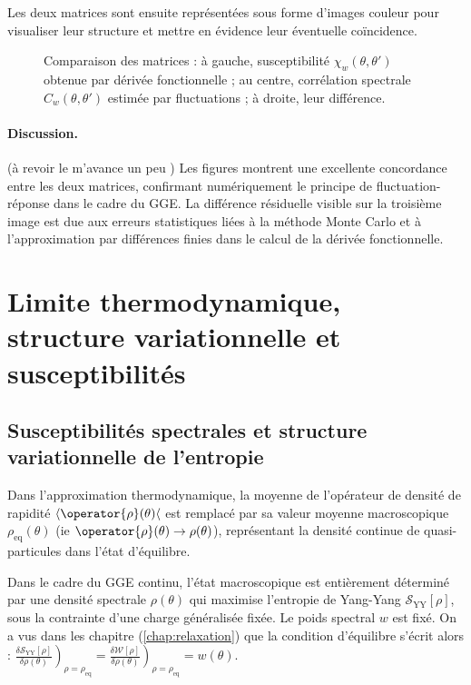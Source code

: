 Les deux matrices sont ensuite représentées sous forme d'images couleur pour visualiser leur structure et mettre en évidence leur éventuelle coïncidence.

\begin{figure}[H]
    \centering
    \caption{Comparaison des matrices : à gauche, susceptibilité \( \chi_w(\theta,\theta') \) obtenue par dérivée fonctionnelle ; au centre, corrélation spectrale \( C_w(\theta,\theta') \) estimée par fluctuations ; à droite, leur différence.}
    \label{fig:comparison_chi_C}
\end{figure}

\paragraph{Discussion.}

{\color{blue} { (\color{red}à revoir le m'avance un peu )} Les figures montrent une excellente concordance entre les deux matrices, confirmant numériquement le principe de fluctuation-réponse dans le cadre du GGE. La différence résiduelle visible sur la troisième image est due aux erreurs statistiques liées à la méthode Monte Carlo et à l’approximation par différences finies dans le calcul de la dérivée fonctionnelle.} 


\section{Limite thermodynamique, structure variationnelle et susceptibilités}

\subsection{Susceptibilités spectrales et structure variationnelle de l’entropie}

Dans l’approximation thermodynamique, la moyenne de l’opérateur de densité de rapidité $ \langle \operator{\rho}(\theta) \langle $ est remplacé par sa valeur moyenne macroscopique $\rho_{\mathrm{eq}}(\theta)$ (ie $\operator{\rho}(\theta) \to \rho(\theta)$), représentant la densité continue de quasi-particules dans l’état d’équilibre.

Dans le cadre du GGE continu, l’état macroscopique est entièrement déterminé par une densité spectrale $\rho(\theta)$ qui maximise l’entropie de Yang-Yang $\mathcal{S}_{\mathrm{YY}}[\rho]$, sous la contrainte d’une charge généralisée fixée. Le poids spectral $w$ est fixé. On a vus dans les chapitre (\ref{chap:relaxation}) que la condition d’équilibre s’écrit alors :
\(
\left. \frac{\delta \mathcal{S}_{\mathrm{YY}}[\rho]}{\delta \rho(\theta)} \right)_{\rho = \rho_{\mathrm{eq}}} = \left. \frac{\delta \mathcal{W}[\rho]}{\delta \rho(\theta)} \right)_{\rho = \rho_{\mathrm{eq}}} =  w(\theta).
\)

